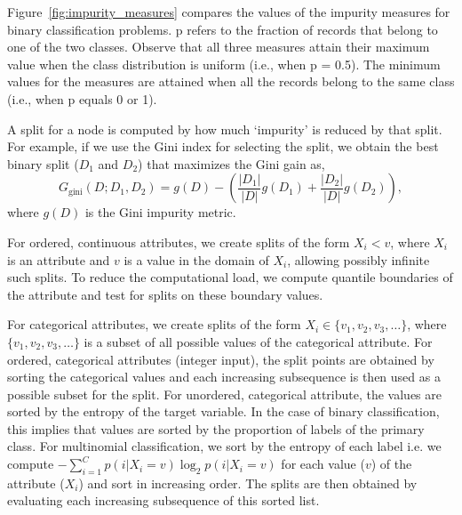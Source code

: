 Figure~\ref{fig:impurity_measures} compares the values of the impurity measures
for binary classification problems. p refers to the fraction of records that
belong to one of the two classes. Observe that all three measures attain their
maximum value when the class distribution is uniform (i.e., when p = 0.5). The
minimum values for the measures are attained when all the records belong to the
same class (i.e., when p equals 0 or 1).

A split for a node is computed by how much `impurity' is reduced by that split.
For example, if we use the Gini index for selecting the split, we obtain the best
binary split ($D_1$ and $D_2$) that maximizes the Gini gain as,
$$
    G_\text{gini}(D; D_1, D_2)= g(D) - \left( \frac{|D_1|}{|D|} g(D_1) +
                                              \frac{|D_2|}{|D|} g(D_2) \right),
$$ where $g(D)$ is the Gini impurity metric.

For ordered, continuous attributes, we create splits of the form $X_i < v$,
where $X_i$ is an attribute and $v$ is a value in the domain of $X_i$, allowing
possibly infinite such splits. To reduce the computational load, we compute
quantile boundaries of the attribute and test for splits on these boundary
values.

For categorical attributes, we create splits of the form
$X_i \in \{v_1, v_2, v_3, \ldots\}$, where $\{v_1, v_2, v_3, \ldots\}$ is
a subset of all possible values of the categorical attribute. For ordered,
categorical attributes (integer input), the split points are obtained by sorting
the categorical values and each increasing subsequence is then used as a
possible subset for the split. For unordered, categorical attribute, the values
are sorted by the entropy of the target variable. In the case of binary
classification, this implies that values are sorted by the proportion of labels
of the primary class. For multinomial classification, we sort by the entropy of
each label i.e. we compute
$-\displaystyle \sum_{i=1}^{C}p(i|X_i=v)\log_2 p(i|X_i=v)$
for each value ($v$) of the attribute ($X_i$) and sort in increasing order.
The splits are then obtained by evaluating each increasing subsequence of
this sorted list.

